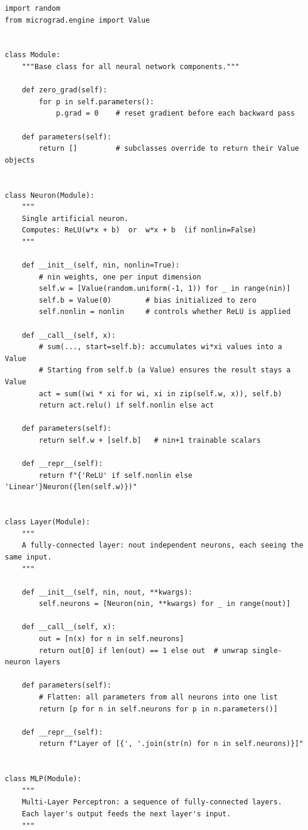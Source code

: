 \documentclass[12pt,a4paper]{article}
\begin{document}
\begin{lstlisting}
import random
from micrograd.engine import Value


class Module:
    """Base class for all neural network components."""

    def zero_grad(self):
        for p in self.parameters():
            p.grad = 0    # reset gradient before each backward pass

    def parameters(self):
        return []         # subclasses override to return their Value objects


class Neuron(Module):
    """
    Single artificial neuron.
    Computes: ReLU(w*x + b)  or  w*x + b  (if nonlin=False)
    """

    def __init__(self, nin, nonlin=True):
        # nin weights, one per input dimension
        self.w = [Value(random.uniform(-1, 1)) for _ in range(nin)]
        self.b = Value(0)        # bias initialized to zero
        self.nonlin = nonlin     # controls whether ReLU is applied

    def __call__(self, x):
        # sum(..., start=self.b): accumulates wi*xi values into a Value
        # Starting from self.b (a Value) ensures the result stays a Value
        act = sum((wi * xi for wi, xi in zip(self.w, x)), self.b)
        return act.relu() if self.nonlin else act

    def parameters(self):
        return self.w + [self.b]   # nin+1 trainable scalars

    def __repr__(self):
        return f"{'ReLU' if self.nonlin else 'Linear'}Neuron({len(self.w)})"


class Layer(Module):
    """
    A fully-connected layer: nout independent neurons, each seeing the same input.
    """

    def __init__(self, nin, nout, **kwargs):
        self.neurons = [Neuron(nin, **kwargs) for _ in range(nout)]

    def __call__(self, x):
        out = [n(x) for n in self.neurons]
        return out[0] if len(out) == 1 else out  # unwrap single-neuron layers

    def parameters(self):
        # Flatten: all parameters from all neurons into one list
        return [p for n in self.neurons for p in n.parameters()]

    def __repr__(self):
        return f"Layer of [{', '.join(str(n) for n in self.neurons)}]"


class MLP(Module):
    """
    Multi-Layer Perceptron: a sequence of fully-connected layers.
    Each layer's output feeds the next layer's input.
    """


\end{lstlisting}
\end{document}
